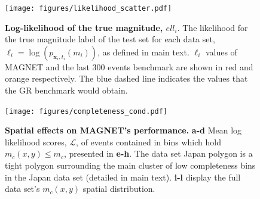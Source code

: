 \documentclass[pdflatex]{sn-jnl}
\begin{document}
\newpage
\begin{figure}[h!]
    \centering
    \texttt{[image: figures/likelihood\_scatter.pdf]}
    \caption{
    \textbf{Log-likelihood of the true magnitude, $ell_i$}. The likelihood for the true magnitude label of the test set for each data set, $\ell_i=\log\left(p_{\textbf{x}_i, t_i}(m_i)\right)$, as defined in main text. $\ell_i$ values of MAGNET and the last 300 events benchmark are shown in red and orange respectively. The blue dashed line indicates the values that the GR benchmark would obtain.
    }
    \label{fig:labels_likelihood}
\end{figure}



\newpage
\begin{figure}[h!]
    \centering
    \texttt{[image: figures/completeness\_cond.pdf]}
    \caption{
        \textbf{Spatial effects on MAGNET's performance.} \textbf{a-d} Mean log likelihood scores, $\mathcal{L}$, of events contained in bins which hold $m_c(x,y) \leq m_c$, presented in \textbf{e-h}. The data set Japan polygon is a tight polygon surrounding the main cluster of low completeness bins in the Japan data set (detailed in main text). \textbf{i-l} display the full data set's $m_c(x,y)$ spatial distribution.
    }
    \label{fig:mean_ll_conditioned_spatial_mc}
\end{figure}
\end{document}
